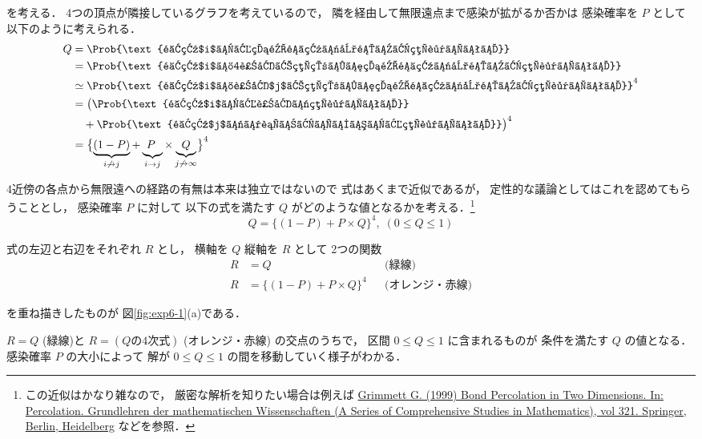 \documentclass[10pt,oneside]{scrartcl}
\begin{document}
を考える．
4つの頂点が隣接しているグラフを考えているので，
隣を経由して無限遠点まで感染が拡がるか否かは
感染確率を \(P\) として以下のように考えられる．
\begin{align}
  Q
  &=\Prob{\text{頂点$i$から無限遠点に到達する経路がない}}\\
  &=\Prob{\text{頂点$i$の4近傍を経由して無限遠点に到達する経路がない}}\\
  &\simeq\Prob{\text{頂点$i$の近傍$j$を経由して無限遠点に到達する経路がない}}^{4}\\
  &=\bigl(\Prob{\text{頂点$i$から近傍に経路がない}}\bigr.\\
  &\quad + \bigl.\Prob{\text{頂点$j$には行けるがそこから経路がない}}\bigr)^{4}\\
  &=\bigl\{
    \underbrace{(1-P)}_{i\not\to j}
    +
    \underbrace{P_{\phantom{j}}}_{i\to j}
    \times\underbrace{Q}_{j\not\to\infty}
    \bigr\}^{4}
\end{align}

4近傍の各点から無限遠への経路の有無は本来は独立ではないので
式はあくまで近似であるが，
定性的な議論としてはこれを認めてもらうこととし，
感染確率 \(P\) に対して
以下の式を満たす \(Q\) がどのような値となるかを考える．\footnote{この近似はかなり雑なので，
厳密な解析を知りたい場合は例えば
\href{https://doi.org/10.1007/978-3-662-03981-6\_11}{Grimmett G. (1999) Bond Percolation in Two Dimensions. In: Percolation. Grundlehren der mathematischen Wissenschaften (A Series of Comprehensive Studies in Mathematics), vol 321. Springer, Berlin, Heidelberg}
などを参照．}
\begin{equation}
  Q=\{(1-P) + P\times Q \}^{4},\;(0\le Q\le 1)
\end{equation}

式の左辺と右辺をそれぞれ \(R\) とし，
横軸を \(Q\)
縦軸を \(R\) として
2つの関数
\begin{align}
  R&=Q && \text{(緑線)}\\
  R&=\{(1-P) + P\times Q\}^{4} &&\text{(オレンジ・赤線)}
\end{align}

を重ね描きしたものが
図\ref{fig:exp6-1}(a)である．

\begin{figure*}%
  \centering
\end{figure*}

\(R=Q\) (緑線)と
\(R=(Q\text{の4次式})\) (オレンジ・赤線)
の交点のうちで，
区間 \(0\le Q\le 1\) に含まれるものが
条件を満たす \(Q\) の値となる．
感染確率 \(P\) の大小によって
解が \(0\le Q\le 1\) の間を移動していく様子がわかる．
\end{document}
